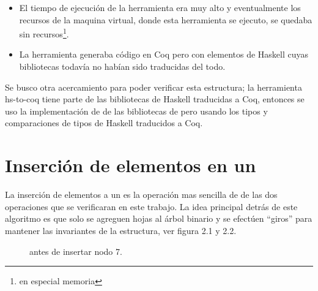 \begin{itemize}
    \item El tiempo de ejecuci\'on de la herramienta era muy alto y eventualmente los recursos de
    la maquina virtual, donde esta herramienta se ejecuto, se quedaba sin recursos\footnote{en
    especial memoria}.
    \item La herramienta generaba c\'odigo en Coq pero con elementos de Haskell cuyas bibliotecas
    todavía no habían sido traducidas del todo.
\end{itemize}{}

Se busco otra acercamiento para poder verificar esta estructura; la herramienta hs-to-coq tiene
parte de las bibliotecas de Haskell traducidas a Coq, entonces se uso la implementación de {\arns}
de las bibliotecas de {\coq}\cite{MSetRBT} pero usando los tipos y comparaciones de tipos de
Haskell traducidos a Coq.

\section{Inserción de elementos en un {\arn}}

La inserci\'on de elementos a un {\arn} es la operaci\'on mas sencilla de de las dos operaciones
que se verificaran en este trabajo. La idea principal detrás de este algoritmo es que solo se
agreguen hojas al \'arbol binario y se efectúen ``giros'' para mantener las invariantes de la
estructura, ver figura 2.1 y 2.2.
\begin{figure}
\centering
\captionsetup{justification=centering}
\label{arbolRB_2}
\caption{{\Arn} antes de insertar nodo 7.}
\end{figure}

